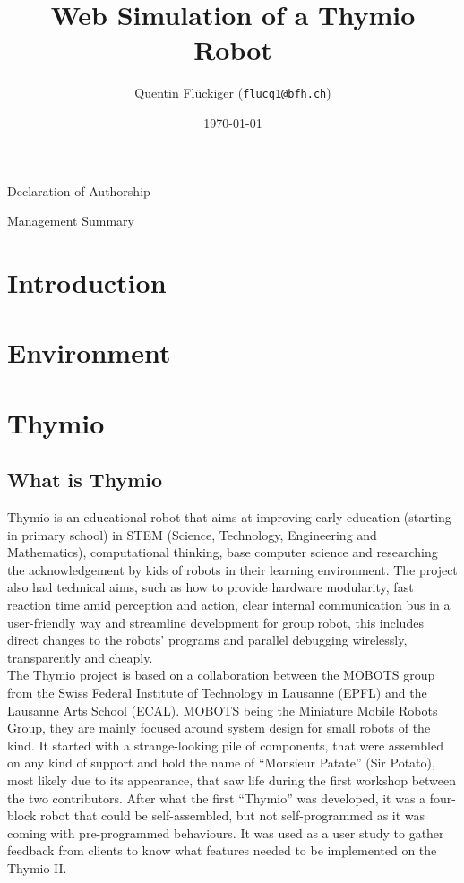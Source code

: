 \documentclass{scrartcl}
\begin{document}
\title{Web Simulation of a Thymio Robot}
\date{\today}   %
\author{Quentin Flückiger (\texttt{flucq1@bfh.ch})}





\maketitle
\clearpage

Declaration of Authorship
\clearpage
\clearpage

Management Summary
\clearpage
\clearpage

\tableofcontents
\clearpage

\section{Introduction}

\section{Environment}

\section{Thymio}
\subsection{What is Thymio} 

Thymio is an educational robot that aims at improving early education (starting in primary school) in STEM (Science, Technology, Engineering and Mathematics),
computational thinking, base computer science and researching the acknowledgement by kids of robots in their learning environment.
The project also had technical aims, such as how to provide hardware modularity, fast reaction time amid perception and action,
clear internal communication bus in a user-friendly way and streamline development for group robot, this includes direct changes to the robots’ programs and parallel debugging wirelessly, 
transparently and cheaply.\\

The Thymio project is based on a collaboration between the MOBOTS group from the Swiss Federal Institute of Technology in Lausanne (EPFL) and the Lausanne Arts School (ECAL).
MOBOTS being the Miniature Mobile Robots Group, they are mainly focused around system design for small robots of the kind. It started with a strange-looking pile of components, 
that were assembled on any kind of support and hold the name of “Monsieur Patate” (Sir Potato), most likely due to its appearance, 
that saw life during the first workshop between the two contributors. After what the first “Thymio” was developed, 
it was a four-block robot that could be self-assembled, but not self-programmed as it was coming with pre-programmed behaviours. 
It was used as a user study to gather feedback from clients to know what features needed to be implemented on the Thymio II.\\
\end{document}
